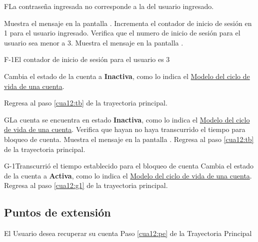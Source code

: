  \begin{UCtrayectoriaA}{F}{La contraseña ingresada no corresponde a la del usuario ingresado.}
	
	\UCpaso[\UCsist] Muestra el mensaje  en la pantalla .
	\UCpaso[\UCsist] Incrementa el contador de inicio de sesión en 1 para el usuario ingresado.
	\UCpaso[\UCsist] Verifica que el numero de inicio de sesión para el usuario sea menor a 3. 
	\UCpaso[\UCsist] Muestra el mensaje  en la pantalla .
	
\end{UCtrayectoriaA}

 \begin{UCtrayectoriaA}{F-1}{El contador de inicio de sesión para el usuario es 3}
	
	\UCpaso[\UCsist] Cambia el estado de la cuenta a \textbf{Inactiva}, como lo indica el \hyperlink{cv:Cuenta}{Modelo del ciclo de vida de una cuenta}.
	
	\UCpaso[] Regresa al paso \ref{cua12:tb} de la trayectoria principal. 
	
	
\end{UCtrayectoriaA}


\begin{UCtrayectoriaA}{G}{La cuenta se encuentra en estado \textbf{Inactiva}, como lo indica el \hyperlink{cv:Cuenta}{Modelo del ciclo de vida de una cuenta}.}
	\UCpaso[\UCsist] Verifica que hayan no haya transcurrido el tiempo para bloqueo de cuenta.
	\UCpaso[\UCsist] Muestra el mensaje  en la pantalla .
	\UCpaso[] Regresa al paso \ref{cua12:tb} de la trayectoria principal. 
	
\end{UCtrayectoriaA}

\begin{UCtrayectoriaA}{G-1}{Transcurrió el tiempo establecido para el bloqueo de cuenta}
	\UCpaso[\UCsist] Cambia el estado de la cuenta a \textbf{Activa}, como lo indica el \hyperlink{cv:Cuenta}{Modelo del ciclo de vida de una cuenta}.
	\UCpaso[] Regresa al paso \ref{cua12:g1} de la trayectoria principal. 
	
\end{UCtrayectoriaA}


\subsection{Puntos de extensión}

\UCExtensionPoint
{El Usuario desea recuperar su cuenta}
{ Paso \ref{cua12:pe} de la Trayectoria Principal}
{}

